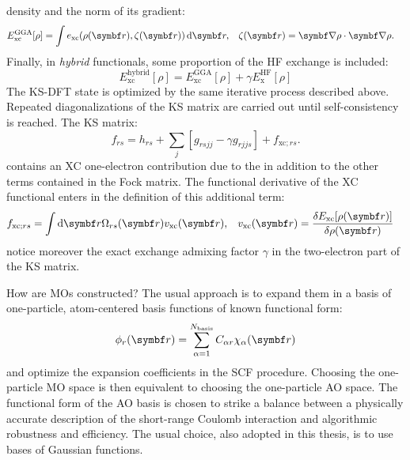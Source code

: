 density and the norm of its gradient:
\begin{alignat}{2}
 E^\mathrm{GGA}_\mathrm{xc}[\rho] = \int
 e_\mathrm{xc}(\rho(\vect{r}),\zeta(\vect{r}))\diff\vect{r},
 \quad&
 \zeta(\vect{r}) = \vect{\nabla}\rho\cdot \vect{\nabla}\rho.
\end{alignat}
Finally, in \emph{hybrid} functionals, some proportion of the
\acrshort{HF} exchange is included:
\begin{equation}
 E^\mathrm{hybrid}_\mathrm{xc}[\rho] = E^\mathrm{GGA}_\mathrm{xc}[\rho] + \gamma E^\mathrm{HF}_\mathrm{x}[\rho]
\end{equation}
The \acrshort{KS}-\acrshort{DFT} state is optimized by the same
iterative process described above.
Repeated diagonalizations of the \acrshort{KS} matrix are carried out
until self-consistency is reached.
The \acrshort{KS} matrix:
\begin{equation}\label{eq:ksmatrix}
  f_{rs} = h_{rs} + \sum_{j}[g_{rsjj} - \gamma g_{rjjs}] + f_{\mathrm{xc};rs}.
\end{equation}
contains an \acrshort{XC} one-electron contribution due to the
in addition to the other terms contained in the Fock matrix.
The functional derivative of the \acrshort*{XC} functional enters in the
definition of this additional term:
\begin{alignat}{2}
  f_{\mathrm{xc}; rs}
  =
  \int\diff\vect{r}\Omega_{rs}(\vect{r})v_\mathrm{xc}(\vect{r}),
  \quad&
  v_\mathrm{xc}(\vect{r})
  =
  \frac{\delta E_\mathrm{xc}[\rho(\vect{r})]}{\delta \rho(\vect{r})}
\end{alignat}
notice moreover the exact exchange admixing factor $\gamma$ in the
two-electron part of the \acrshort*{KS} matrix.

How are \glspl*{MO} constructed? The usual approach is to expand them in
a basis of one-particle, atom-centered basis functions of known
functional form:
\begin{equation}
  \phi_r(\vect{r})
  =
  \sum_{\alpha=1}^{N_\mathrm{basis}}
  C_{\alpha r}\chi_{\alpha}(\vect{r})
\end{equation}
and optimize the expansion coefficients in the \acrshort*{SCF} procedure.
Choosing the one-particle \acrshort*{MO} space is then equivalent to
choosing the one-particle \gls{AO} space.
The functional form of the \acrshort*{AO} basis is chosen to strike a
balance between a physically accurate description of the short-range
Coulomb interaction and algorithmic robustness and
efficiency.\autocite{Helgaker2000-tz}
The usual choice, also adopted in this thesis, is to use bases of
Gaussian functions.\autocite{Helgaker1995-gi, Reine2012-tq}


